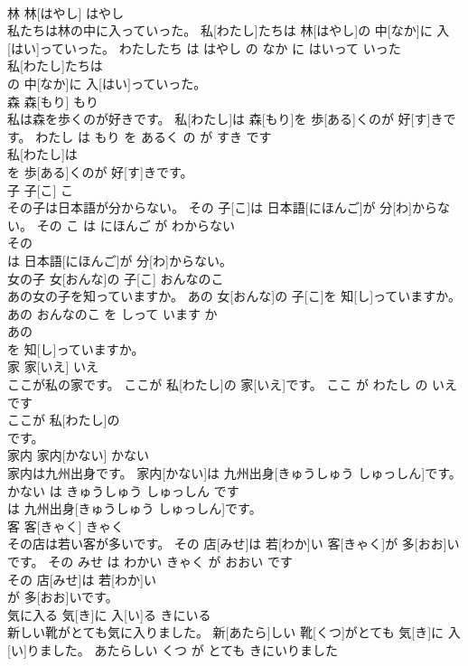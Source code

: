 \documentclass[8pt]{extreport}
\begin{document}
\begin{CJK}{UTF8}{min}
\\	林	林[はやし]	はやし	
\\	私たちは林の中に入っていった。	私[わたし]たちは 林[はやし]の 中[なか]に 入[はい]っていった。	わたしたち は はやし の なか に はいって いった	
\\	私[わたし]たちは
\\	の 中[なか]に 入[はい]っていった。			
\\	森	森[もり]	もり	
\\	私は森を歩くのが好きです。	私[わたし]は 森[もり]を 歩[ある]くのが 好[す]きです。	わたし は もり を あるく の が すき です	
\\	私[わたし]は
\\	を 歩[ある]くのが 好[す]きです。			
\\	子	子[こ]	こ	
\\	その子は日本語が分からない。	その 子[こ]は 日本語[にほんご]が 分[わ]からない。	その こ は にほんご が わからない	
\\	その
\\	は 日本語[にほんご]が 分[わ]からない。			
\\	女の子	女[おんな]の 子[こ]	おんなのこ	
\\	あの女の子を知っていますか。	あの 女[おんな]の 子[こ]を 知[し]っていますか。	あの おんなのこ を しって います か	
\\	あの
\\	を 知[し]っていますか。			
\\	家	家[いえ]	いえ	
\\	ここが私の家です。	ここが 私[わたし]の 家[いえ]です。	ここ が わたし の いえ です	
\\	ここが 私[わたし]の
\\	です。			
\\	家内	家内[かない]	かない	
\\	家内は九州出身です。	家内[かない]は 九州出身[きゅうしゅう しゅっしん]です。	かない は きゅうしゅう しゅっしん です	
\\	は 九州出身[きゅうしゅう しゅっしん]です。			
\\	客	客[きゃく]	きゃく	
\\	その店は若い客が多いです。	その 店[みせ]は 若[わか]い 客[きゃく]が 多[おお]いです。	その みせ は わかい きゃく が おおい です	
\\	その 店[みせ]は 若[わか]い
\\	が 多[おお]いです。			
\\	気に入る	気[き]に 入[い]る	きにいる	
\\	新しい靴がとても気に入りました。	新[あたら]しい 靴[くつ]がとても 気[き]に 入[い]りました。	あたらしい くつ が とても きにいりました	

\end{CJK}
\end{document}
